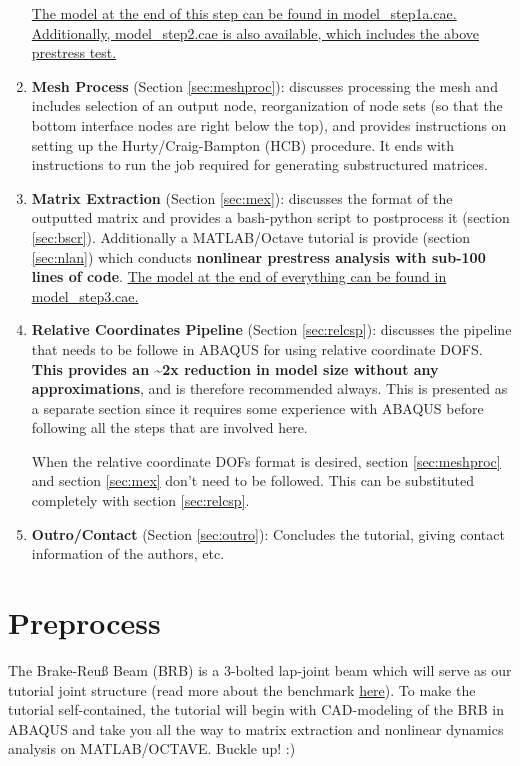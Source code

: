 \documentclass[11pt]{article}
\begin{document}
\begin{enumerate}
\uline{The model at the end of this step can be found in \href{https://github.com/Nidish96/Abaqus4Joints/blob/main/assets/assembly/model\_step1a.cae}{model\_step1a.cae}. Additionally, \href{https://github.com/Nidish96/Abaqus4Joints/blob/main/assets/assembly/model\_step2.cae}{model\_step2.cae} is also available, which includes the above prestress test.}
\item \textbf{Mesh Process} (Section \ref{sec:meshproc}): discusses processing the mesh and includes selection of an output node, reorganization of node sets (so that the bottom interface nodes are right below the top), and provides instructions on setting up the Hurty/Craig-Bampton (HCB) procedure. It ends with instructions to run the job required for generating substructured matrices.
\item \textbf{Matrix Extraction} (Section \ref{sec:mex}): discusses the format of the outputted matrix and provides a bash-python script to postprocess it (section \ref{sec:bscr}). Additionally a MATLAB/Octave tutorial is provide (section \ref{sec:nlan}) which conducts \textbf{nonlinear prestress analysis with sub-100 lines of code}.
\uline{The model at the end of everything can be found in \href{https://github.com/Nidish96/Abaqus4Joints/blob/main/assets/assembly/model\_step3.cae}{model\_step3.cae}.}
\item \textbf{Relative Coordinates Pipeline} (Section \ref{sec:relcsp}): discusses the pipeline that needs to be followe in ABAQUS for using relative coordinate DOFS. \textbf{This provides an \textasciitilde{}2x reduction in model size without any approximations}, and is therefore recommended always.
This is presented as a separate section since it requires some experience with ABAQUS before following all the steps that are involved here.

When the relative coordinate DOFs format is desired, section \ref{sec:meshproc} and section \ref{sec:mex} don't need to be followed. This can be substituted completely with section \ref{sec:relcsp}.
\item \textbf{Outro/Contact} (Section \ref{sec:outro}): Concludes the tutorial, giving contact information of the authors, etc.
\end{enumerate}
\pagebreak
\section{Preprocess}
\label{sec:prepro}
The Brake-Reuß Beam (BRB) is a 3-bolted lap-joint beam which will serve as our tutorial joint structure (read more about the benchmark \href{https://jointmechanics.org/index.php/Benchmarks\#The\_Brake-Reu\%C3\%9F\_Beams}{here}).
To make the tutorial self-contained, the tutorial will begin with CAD-modeling of the BRB in ABAQUS and take you all the way to matrix extraction and nonlinear dynamics analysis on MATLAB/OCTAVE.
Buckle up! :)
\end{document}

